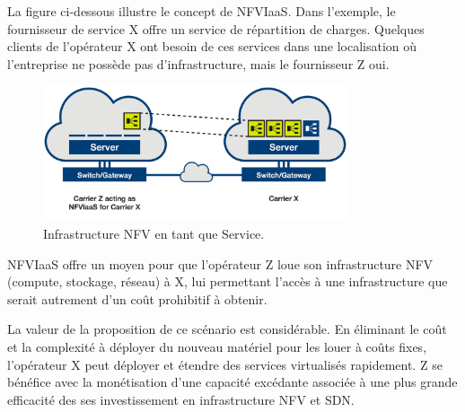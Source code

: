 La figure ci-dessous illustre le concept de NFVIaaS. Dans l'exemple, le fournisseur de service X offre un service de répartition de charges. Quelques clients de l'opérateur X ont besoin de ces services dans une localisation où l'entreprise ne possède pas d'infrastructure, mais le fournisseur Z oui.\\



\begin{figure}[h]
\begin{center}
\includegraphics[width=0.8\textwidth]{images/NFVIaaS} 
\caption{Infrastructure NFV en tant que Service. \cite{OFSDNNFVand}} \label{nfviaas}
\end{center}
\end{figure} 

NFVIaaS offre un moyen pour que l'opérateur Z loue son infrastructure NFV (compute, stockage, réseau) à X, lui permettant l'accès à une infrastructure que serait autrement d'un coût prohibitif à obtenir.

La valeur de la proposition de ce scénario est considérable. En éliminant le coût et la complexité à déployer du nouveau matériel pour les louer à coûts fixes, l'opérateur X peut déployer et étendre des services virtualisés rapidement. Z se bénéfice avec la monétisation d'une capacité excédante associée à une plus grande efficacité des ses investissement en infrastructure NFV et SDN.

